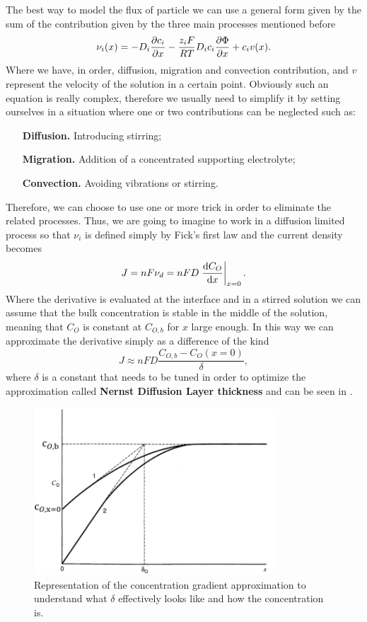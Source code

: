 The best way to model the flux of particle we can use a general form given by the sum of the contribution given by the three main processes mentioned before
\begin{equation}
    \nu_i(x) = -D_i\pdv{c_i}{x} - \frac{z_i F}{RT}D_i c_i\pdv{\Phi}{x} + c_iv(x).
\end{equation}
Where we have, in order, diffusion, migration and convection contribution, and $v$ represent the velocity of the solution in a certain point. Obviously such an equation is really complex, therefore we usually need to simplify it by setting ourselves in a situation where one or two contributions can be neglected such as:
\begin{itemize}[align=left, leftmargin=*]
    \item[\textbf{Diffusion.}] Introducing stirring;
    \item[\textbf{Migration.}] Addition of a concentrated supporting electrolyte;
    \item[\textbf{Convection.}] Avoiding vibrations or stirring. 
\end{itemize}
Therefore, we can choose to use one or more trick in order to eliminate the related processes. Thus, we are going to imagine to work in a diffusion limited process so that $\nu_i$ is defined simply by Fick's first law and the current density becomes
\begin{equation}
    J = nF\nu_d = nFD\eval{\dv{C_O}{x}}_{x=0}.
\end{equation} 
Where the derivative is evaluated at the interface and in a stirred solution we can assume that the bulk concentration is stable in the middle of the solution, meaning that $C_O$ is constant at $C_{O,b}$ for $x$ large enough. In this way we can approximate the derivative simply as a difference of the kind
\begin{equation}
    \label{eq:CurrentDiffusion}
    J \approx nFD\frac{C_{O,b} - C_{O}(x=0)}{\delta},
\end{equation}
where $\delta$ is a constant that needs to be tuned in order to optimize the approximation called \textbf{Nernst Diffusion Layer thickness} and can be seen in .
\begin{figure}[t]
    \centering
    \includegraphics[width=0.8\textwidth]{Immagini/ApproxDensGrad.png}
    \caption{
        Representation of the concentration gradient approximation to understand what $\delta$ effectively looks like and how the concentration is.
    }
    \label{fig:ApproxDensGrad}
\end{figure}
